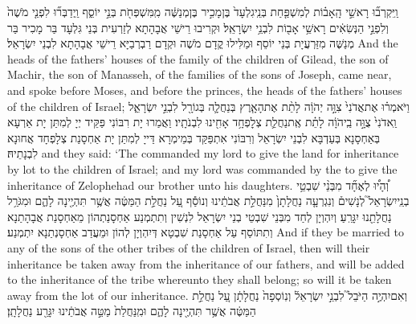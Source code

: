 \newperek
{}
{וַֽיִּקְרְב֞וּ רָאשֵׁ֣י הָֽאָב֗וֹת לְמִשְׁפַּ֤חַת בְּנֵֽי\maqqaf גִלְעָד֙ בֶּן\maqqaf מָכִ֣יר בֶּן\maqqaf מְנַשֶּׁ֔ה מִֽמִּשְׁפְּחֹ֖ת בְּנֵ֣י יוֹסֵ֑ף וַֽיְדַבְּר֞וּ לִפְנֵ֤י מֹשֶׁה֙ וְלִפְנֵ֣י הַנְּשִׂאִ֔ים רָאשֵׁ֥י אָב֖וֹת לִבְנֵ֥י יִשְׂרָאֵֽל׃}
{וּקְרִיבוּ רֵישֵׁי אֲבָהָתָא לְזַרְעִית בְּנֵי גִּלְעָד בַּר מָכִיר בַּר מְנַשֶּׁה מִזַּרְעֲיָת בְּנֵי יוֹסֵף וּמַלִּילוּ קֳדָם מֹשֶׁה וּקְדָם רַבְרְבַיָּא רֵישֵׁי אֲבָהָתָא לִבְנֵי יִשְׂרָאֵל׃}
{And the heads of the fathers’ houses of the family of the children of Gilead, the son of Machir, the son of Manasseh, of the families of the sons of Joseph, came near, and spoke before Moses, and before the princes, the heads of the fathers’ houses of the children of Israel;}{}
{וַיֹּאמְר֗וּ אֶת\maqqaf אֲדֹנִי֙ צִוָּ֣ה יְהֹוָ֔ה לָתֵ֨ת אֶת\maqqaf הָאָ֧רֶץ בְּנַחֲלָ֛ה בְּגוֹרָ֖ל לִבְנֵ֣י יִשְׂרָאֵ֑ל וַֽאדֹנִי֙ צֻוָּ֣ה בַֽיהֹוָ֔ה לָתֵ֗ת אֶֽת\maqqaf נַחֲלַ֛ת צְלׇפְחָ֥ד אָחִ֖ינוּ לִבְנֹתָֽיו׃}
{וַאֲמַרוּ יָת רִבּוֹנִי פַּקֵּיד יְיָ לְמִתַּן יָת אַרְעָא בְּאַחְסָנָא בְּעַדְבָּא לִבְנֵי יִשְׂרָאֵל וְרִבּוֹנִי אִתְפַּקַּד בְּמֵימְרָא דַּייָ לְמִתַּן יָת אַחְסָנַת צְלָפְחָד אֲחוּנָא לִבְנָתֵיהּ׃}
{and they said: ‘The \lord\space commanded my lord to give the land for inheritance by lot to the children of Israel; and my lord was commanded by the \lord\space to give the inheritance of Zelophehad our brother unto his daughters.}{}
{וְ֠הָי֠וּ לְאֶחָ֞ד מִבְּנֵ֨י שִׁבְטֵ֥י בְנֵֽי\maqqaf יִשְׂרָאֵל֮ לְנָשִׁים֒ וְנִגְרְעָ֤ה נַחֲלָתָן֙ מִנַּחֲלַ֣ת אֲבֹתֵ֔ינוּ וְנוֹסַ֕ף עַ֚ל נַחֲלַ֣ת הַמַּטֶּ֔ה אֲשֶׁ֥ר תִּהְיֶ֖ינָה לָהֶ֑ם וּמִגֹּרַ֥ל נַחֲלָתֵ֖נוּ יִגָּרֵֽעַ׃}
{וְיִהְוְיָן לְחַד מִבְּנֵי שִׁבְטֵי בְנֵי יִשְׂרָאֵל לִנְשִׁין וְתִתְמְנַע אַחְסָנַתְהוֹן מֵאַחְסָנַת אֲבָהָתַנָא וְתִתּוֹסַף עַל אַחְסָנַת שִׁבְטָא דְּיִהְוְיָן לְהוֹן וּמֵעֲדַב אַחְסָנְתַנָא יִתְמְנַע׃}
{And if they be married to any of the sons of the other tribes of the children of Israel, then will their inheritance be taken away from the inheritance of our fathers, and will be added to the inheritance of the tribe whereunto they shall belong; so will it be taken away from the lot of our inheritance.}{}
{וְאִם\maqqaf יִהְיֶ֣ה הַיֹּבֵל֮ לִבְנֵ֣י יִשְׂרָאֵל֒ וְנֽוֹסְפָה֙ נַחֲלָתָ֔ן עַ֚ל נַחֲלַ֣ת הַמַּטֶּ֔ה אֲשֶׁ֥ר תִּהְיֶ֖ינָה לָהֶ֑ם וּמִֽנַּחֲלַת֙ מַטֵּ֣ה אֲבֹתֵ֔ינוּ יִגָּרַ֖ע נַחֲלָתָֽן׃}
